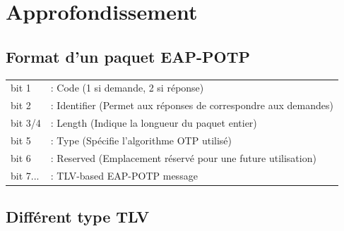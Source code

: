 \documentclass{../res/univ-projet}
\begin{document}
\section{Approfondissement}

\subsection{Format d'un paquet EAP-POTP}

\begin{tabular}{  l  l  }
	bit 1 &: Code (1 si demande, 2 si réponse)\\
	bit 2 &: Identifier (Permet aux réponses de correspondre aux demandes)\\
	bit 3/4 &: Length (Indique la longueur du paquet entier)\\
	bit 5 &: Type (Spécifie l'algorithme OTP utilisé)\\
	bit 6 &: Reserved (Emplacement réservé pour une future utilisation)\\
	bit 7... &: TLV-based EAP-POTP message \\
\end{tabular}

\subsection{Différent type TLV}
\end{document}
